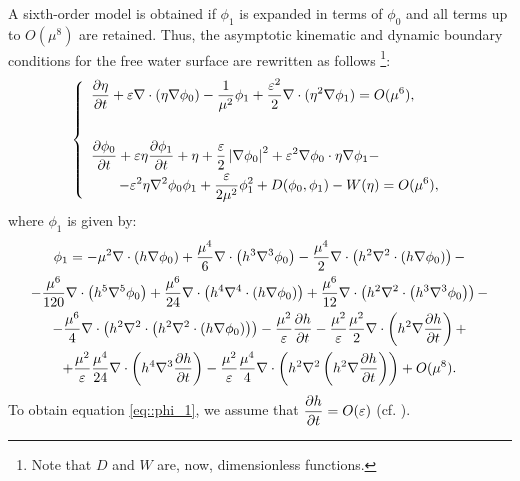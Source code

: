 A sixth-order model is obtained if 
 \(\phi_1\) is expanded in terms of \(\phi_0\) and all terms
up to \(O(\mu^8)\) are retained. 
Thus,  the asymptotic kinematic and dynamic
boundary conditions for the free water surface  are
rewritten as
 follows \footnote{Note that \(D\)
and \(W\) are, now,   dimensionless functions.}:
\begin{equation}\label{eq::kindyn}
\renewcommand{\arraystretch}{1.7}
\left\{\begin{array}{l}
\displaystyle\fpar{\eta}{t}+\varepsilon\nabla\cdot(\eta\nabla\phi_0)-\frac{1}{\mu^2}\phi_1+
\frac{\varepsilon^2}{2}\nabla\cdot(\eta^2\nabla\phi_1)=O(\mu^{6}),\\ \\
\displaystyle \fpar{\phi_0}{t}+\varepsilon\eta\fpar{\phi_1}{t}+\eta +
\frac{\varepsilon}{2} \left|\nabla\phi_0\right|^2+\varepsilon^2\nabla\phi_0\cdot\eta\nabla\phi_1-\\
\displaystyle \qquad -\varepsilon^2\eta\nabla^2\phi_0\phi_1
+\frac{\varepsilon}{2\mu^2}\phi_1^2
+D(\phi_0,\phi_1)-W(\eta)
=O(\mu^{6}),
\end{array}\right .
\end{equation}
where \(\phi_1\) is given by:
\begin{multline}\label{eq::phi_1}
\phi_1=
-\mu^{2}\nabla\cdot\left(h\nabla\phi_0\right)
+\frac{\mu^{4}}{6}\nabla\cdot\left(h^3\nabla^3\phi_0\right)
-\frac{\mu^{4}}{2}\nabla\cdot\left(h^2
\nabla^2\cdot\left(h\nabla\phi_0\right) \right)-\\
-\frac{\mu^6}{120}\nabla\cdot\left(h^5\nabla^5\phi_0\right)+
\frac{\mu^6}{24}\nabla\cdot\left(h^4\nabla^4\cdot\left(h\nabla\phi_0\right)\right)+\frac{\mu^6}{12}\nabla\cdot\left(h^2\nabla^2\cdot\left(h^3\nabla^3\phi_0\right)\right)-\\
-\frac{\mu^6}{4}\nabla\cdot\left(h^2\nabla^2\cdot\left(h^2\nabla^2\cdot\left(h\nabla\phi_0\right)\right)\right)
-\frac{\mu^2}{\varepsilon}\frac{\partial h}{\partial t}-
\frac{\mu^2}{\varepsilon}\frac{\mu^2}{2}\nabla\cdot\left(h^2\nabla\frac{\partial h}{\partial t}\right)+\\
+\frac{\mu^2}{\varepsilon}\frac{\mu^4}{24}\nabla\cdot\left(h^4\nabla^3
\frac{\partial h}{\partial t}\right)
-\frac{\mu^2}{\varepsilon}\frac{\mu^4}{4}\nabla\cdot\left(h^2\nabla^2\left(h^2\nabla\frac{\partial h}{\partial t}\right)\right)+O(\mu^{8}).
\end{multline}
To obtain equation \eqref{eq::phi_1}, we assume
that \(\displaystyle\frac{\partial h}{\partial t}=O(\varepsilon)\) (cf. \cite{DutDia07}).



